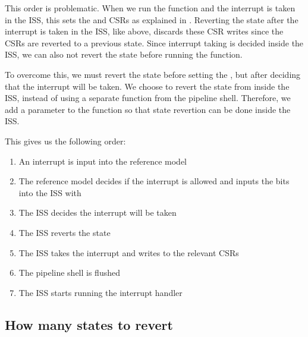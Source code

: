This order is problematic. When we run the  function and the interrupt is taken in the ISS, this sets the  and  CSRs as explained in . Reverting the state after the interrupt is taken in the ISS, like above, discards these CSR writes since the CSRs are reverted to a previous state. Since interrupt taking is decided inside the ISS, we can also not revert the state before running the  function.

To overcome this, we must revert the state before setting the , but after deciding that the interrupt will be taken. We choose to revert the state from inside the ISS, instead of using a separate  function from the pipeline shell. Therefore, we add a  parameter to the  function so that state revertion can be done inside the ISS.

This gives us the following order:

\begin{enumerate}
    \item An interrupt is input into the reference model
    \item The reference model decides if the interrupt is allowed and inputs the  bits into the ISS with 
    \item The ISS decides the interrupt will be taken
    \item The ISS reverts the state
    \item  The ISS takes the interrupt and writes to the relevant CSRs
    \item The pipeline shell is flushed
    \item The ISS starts running the interrupt handler
\end{enumerate}

\subsection{How many states to revert}

